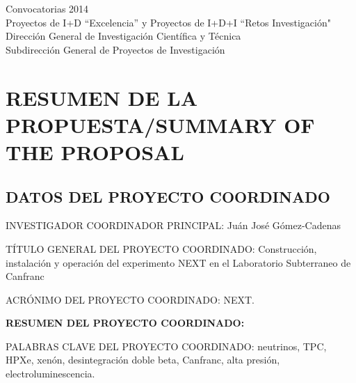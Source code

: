 \documentclass[a4paper,11pt,oneside]{article}
\begin{document}


\begin{center}
{\Large \textsf{Convocatorias 2014}} \\ \vspace{0.3cm}
{\Large  \textsf{Proyectos de I+D ``Excelencia'' y Proyectos de I+D+I ``Retos Investigación"}} \\ 
{\Large \textsf{Dirección General de Investigación Científica y Técnica}} \\
{\Large \textsf{Subdirección General de Proyectos de Investigación }} \\ 
\end{center}


\section{\bf \textsf{RESUMEN DE LA PROPUESTA/SUMMARY OF THE PROPOSAL}}
\subsection{\sc DATOS DEL PROYECTO COORDINADO}

{\sc INVESTIGADOR COORDINADOR PRINCIPAL:} Ju\'an Jos\'e  G\'omez-Cadenas
\vspace{0.3cm}

{\sc TÍTULO GENERAL DEL PROYECTO COORDINADO:} Construcci\'on, instalaci\'on y operaci\'on del experimento NEXT en el Laboratorio Subterraneo de Canfranc

\vspace{0.3cm}

{\sc ACRÓNIMO DEL PROYECTO COORDINADO:} NEXT.
\vspace{0.3cm}

{\bf RESUMEN DEL PROYECTO COORDINADO:} 
\vspace{0.3cm}
%
 
 \vspace{0.3cm}

{\sc PALABRAS CLAVE DEL PROYECTO COORDINADO:} neutrinos, TPC, HPXe, xenón, desintegración doble beta, Canfranc, alta presión, electroluminescencia. 
\end{document}

